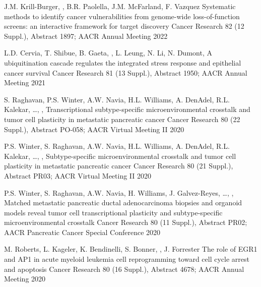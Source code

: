   \abstr
    {J.M. Krill-Burger, \me, B.R. Paolella, J.M. McFarland, F. Vazquez}
    {Systematic methods to identify cancer vulnerabilities from genome-wide loss-of-function screens: an interactive framework for target discovery}
    {Cancer Research 82 (12 Suppl.), Abstract 1897; AACR Annual Meeting}
    {2022}

  \abstr
    {L.D. Cervia, T. Shibue, B. Gaeta, \me, L. Leung, N. Li, N. Dumont, \etal}
    {A ubiquitination cascade regulates the integrated stress response and epithelial cancer survival}
    {Cancer Research 81 (13 Suppl.), Abstract 1950; AACR Annual Meeting}
    {2021}

  \abstr
    {S. Raghavan, P.S. Winter, A.W. Navia, H.L. Williams, A. DenAdel, R.L. Kalekar, \ldots, \me, \etal}
    {Transcriptional subtype-specific microenvironmental crosstalk and tumor cell plasticity in metastatic pancreatic cancer}
    {Cancer Research 80 (22 Suppl.), Abstract PO-058; AACR Virtual Meeting II}
    {2020}

  \abstr
    {P.S. Winter, S. Raghavan, A.W. Navia, H.L. Williams, A. DenAdel, R.L. Kalekar, \ldots, \me, \etal}
    {Subtype-specific microenvironmental crosstalk and tumor cell plasticity in metastatic pancreatic cancer}
    {Cancer Research 80 (21 Suppl.), Abstract PR03; AACR Virtual Meeting II}
    {2020}

  \abstr
    {P.S. Winter, S. Raghavan, A.W. Navia, H. Williams, J. Galvez-Reyes, \ldots, \me, \etal}
    {Matched metastatic pancreatic ductal adenocarcinoma biopsies and organoid models reveal tumor cell transcriptional plasticity and subtype-specific microenvironmental crosstalk}
    {Cancer Research 80 (11 Suppl.), Abstract PR02; AACR Pancreatic Cancer Special Conference}
    {2020}

  \abstr
    {M. Roberts, L. Kageler, K. Bendinelli, S. Bonner, \me, J. Forrester}
    {The role of EGR1 and AP1 in acute myeloid leukemia cell reprogramming toward cell cycle arrest and apoptosis}
    {Cancer Research 80 (16 Suppl.), Abstract 4678; AACR Annual Meeting}
    {2020}

\sectionListEnd
